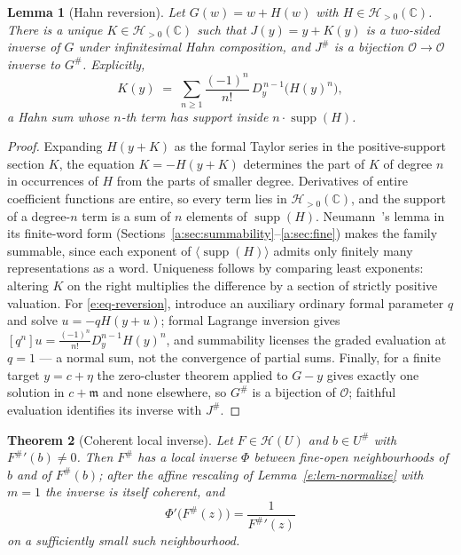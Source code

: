\documentclass[11pt,a4paper]{article}
\numberwithin{equation}{section}
\newtheorem{theorem}{Theorem}[section]
\newtheorem{lemma}[theorem]{Lemma}
\theoremstyle{definition}
\theoremstyle{remark}
\theoremstyle{plain}
\newcommand{\CC}{\mathbb C}
\newcommand{\Ov}{\mathcal O}
\newcommand{\mm}{\mathfrak m}
\DeclareMathOperator{\supp}{supp}
\newcommand{\halo}[1]{#1^{\#}}
\newcommand{\ev}[1]{#1^{\#}}
\newcommand{\Hc}{\mathcal H}
\newcommand{\Neu}[1]{\langle #1\rangle}
\begin{document}
\begin{lemma}[Hahn reversion]\label{e:lem-reversion}
Let $G(w)=w+H(w)$ with $H\in\Hc_{>0}(\CC)$.  There is a unique
$K\in\Hc_{>0}(\CC)$ such that $J(y)=y+K(y)$ is a two-sided inverse of $G$
under infinitesimal Hahn composition, and $\ev J$ is a bijection
$\Ov\to\Ov$ inverse to $\ev G$.  Explicitly,
\begin{equation}\label{e:eq-reversion}
 K(y)\;=\;\sum_{n\ge1}\frac{(-1)^n}{n!}\,
   D_y^{\,n-1}\bigl(H(y)^n\bigr),
\end{equation}
a Hahn sum whose $n$-th term has support inside $n\cdot\supp(H)$.
\end{lemma}

\begin{proof}
Expanding $H(y+K)$ as the formal Taylor series in the positive-support
section $K$, the equation $K=-H(y+K)$ determines the part of $K$ of degree
$n$ in occurrences of $H$ from the parts of smaller degree.  Derivatives
of entire coefficient functions are entire, so every term lies in
$\Hc_{>0}(\CC)$, and the support of a degree-$n$ term is a sum of $n$
elements of $\supp(H)$.  Neumann~\cite{Neumann}'s lemma in its finite-word form (Sections~\ref{a:sec:summability}--\ref{a:sec:fine})
makes the family summable, since each exponent of
$\Neu{\supp(H)}$ admits only finitely many representations as a word.
Uniqueness follows by comparing least exponents: altering $K$ on the right
multiplies the difference by a section of strictly positive valuation.
For \eqref{e:eq-reversion}, introduce an auxiliary ordinary formal
parameter $q$ and solve $u=-qH(y+u)$; formal Lagrange inversion gives
$[q^n]u=\frac{(-1)^n}{n!}D_y^{n-1}H(y)^n$, and summability licenses the
graded evaluation at $q=1$ --- a normal sum, not the convergence of
partial sums.  Finally, for a finite target $y=c+\eta$ the zero-cluster
theorem applied to $G-y$ gives exactly one solution in $c+\mm$ and none
elsewhere, so $\ev G$ is a bijection of $\Ov$; faithful evaluation
identifies its inverse with $\ev J$.
\end{proof}

\begin{theorem}[Coherent local inverse]\label{e:thm-localinverse}
Let $F\in\Hc(U)$ and $b\in\halo U$ with $\ev F{}'(b)\ne0$.  Then $\ev F$
has a local inverse $\Phi$ between fine-open neighbourhoods of $b$ and of
$\ev F(b)$; after the affine rescaling of Lemma~\ref{e:lem-normalize} with
$m=1$ the inverse is itself coherent, and
\[
 \Phi'\bigl(\ev F(z)\bigr)=\frac1{\ev F{}'(z)}
\]
on a sufficiently small such neighbourhood.
\end{theorem}
\end{document}
